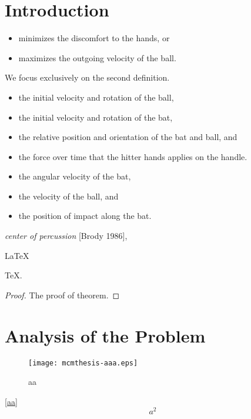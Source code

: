 \documentclass{mcmthesis}
\begin{document}
\section{Introduction}

\lipsum[2]
\begin{itemize}
\item minimizes the discomfort to the hands, or
\item maximizes the outgoing velocity of the ball.
\end{itemize}
We focus exclusively on the second definition.

\begin{itemize}
\item the initial velocity and rotation of the ball,
\item the initial velocity and rotation of the bat,
\item the relative position and orientation of the bat and ball, and
\item the force over time that the hitter hands applies on the handle.
\end{itemize}
\lipsum[3]
\begin{itemize}
\item the angular velocity of the bat,
\item the velocity of the ball, and
\item the position of impact along the bat.
\end{itemize}
\lipsum[4]
\emph{center of percussion} [Brody 1986], \lipsum[5]

\begin{Theorem} \label{thm:latex}
\LaTeX
\end{Theorem}
\begin{Lemma} \label{thm:tex}
\TeX .
\end{Lemma}
\begin{proof}
The proof of theorem.
\end{proof}





\section{Analysis of the Problem}
\begin{figure}[h]
\small
\centering
\texttt{[image: mcmthesis-aaa.eps]}
\caption{aa} \label{fig:aa}
\end{figure}

 \eqref{aa}
\begin{equation}
a^2 \label{aa}
\end{equation}
\end{document}
